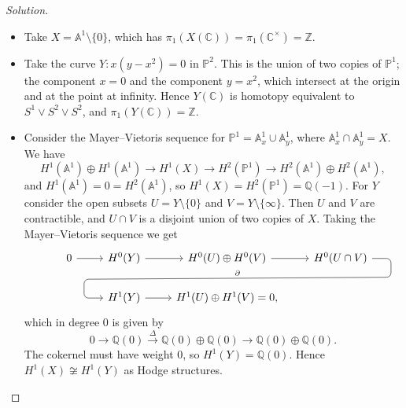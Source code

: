 \documentclass{article}
\theoremstyle{definition}
\renewcommand{\P}{\mathbb{P}}
\newcommand{\A}{\mathbb{A}}
\newcommand{\Z}{\mathbb{Z}}
\newcommand{\Q}{\mathbb{Q}}
\newcommand{\C}{\mathbb{C}}
\begin{document}
\begin{proof}[Solution]
    \begin{itemize}
        \item Take $X=\A^1\setminus\{0\}$, which has
            $\pi_1(X(\C))=\pi_1(\C^\times)=\Z$.


        \item Take the curve $Y:x(y-x^2)=0$ in $\P^2$. This is the union of two
            copies of $\P^1$; the component $x=0$ and the component $y=x^2$,
            which intersect at the origin and at the point at infinity. Hence
            $Y(\C)$ is homotopy equivalent to $S^1\vee S^2\vee S^2$, and
            $\pi_1(Y(\C))=\Z$.

        \item Consider the Mayer--Vietoris sequence for $\P^1=\A^1_x\cup\A^1_y$,
            where $\A^1_x\cap\A^1_y=X$. We have
            \begin{equation*}
                H^1(\A^1)\oplus H^1(\A^1) \to
                H^1(X) \to
                H^2(\P^1) \to
                H^2(\A^1)\oplus H^2(\A^1),
            \end{equation*}
            and $H^1(\A^1)=0=H^2(\A^1)$, so $H^1(X)=H^2(\P^1)=\Q(-1)$. For $Y$
            consider the open subsets $U=Y\setminus\{0\}$ and
            $V=Y\setminus\{\infty\}$. Then $U$ and $V$ are contractible, and
            $U\cap V$ is a disjoint union of two copies of $X$. Taking the
            Mayer--Vietoris sequence we get
            \begin{equation*}
                \begin{tikzcd}
                    &0 \ar[r] &H^0(Y) \ar[r]
                    &H^0(U)\oplus H^0(V) \ar[r]
                    &H^0(U\cap V)
                        \ar[sloped,rounded corners,dll,"\partial",to path={
                            -| ([yshift=-.6cm,xshift=.6cm]\tikztostart.east)
                            -- ([yshift=.6cm,xshift=-.6cm]\tikztotarget.west)
                            \tikztonodes
                            |- (\tikztotarget)
                        }] \\
                    & &H^1(Y) \ar[r]
                    &H^1(U)\oplus H^1(V)=0,
                \end{tikzcd}
            \end{equation*}
            which in degree 0 is given by
            \begin{equation*}
                0\to\Q(0)\xrightarrow\Delta\Q(0)\oplus\Q(0)\to\Q(0)\oplus\Q(0).
            \end{equation*}
            The cokernel must have weight 0, so $H^1(Y)=\Q(0)$. Hence
            $H^1(X)\not\cong H^1(Y)$ as Hodge structures.
    \end{itemize}
\end{proof}
\end{document}
